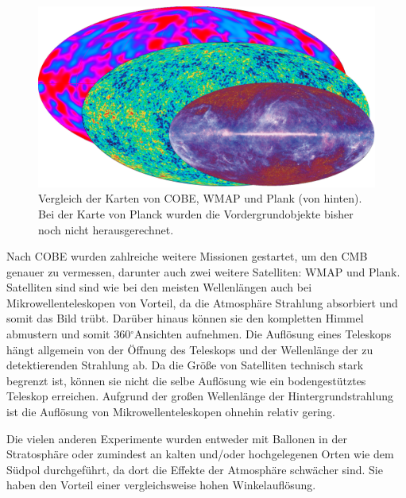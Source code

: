 \documentclass[10pt,a4paper]{article}
\newcommand{\degree}{$^\circ$}
\begin{document}
\begin{figure}
\center
\includegraphics[scale=0.15]{CMB}
\caption{Vergleich der Karten von COBE, WMAP und Plank (von hinten). Bei der Karte von Planck wurden die Vordergrundobjekte bisher noch nicht herausgerechnet.}
\label{cmb}
\end{figure}

Nach COBE wurden zahlreiche weitere Missionen gestartet, um den CMB genauer zu vermessen, darunter auch zwei weitere Satelliten: WMAP und Plank.
Satelliten sind sind wie bei den meisten Wellenlängen auch bei Mikrowellenteleskopen von Vorteil, da die Atmosphäre Strahlung absorbiert und somit das Bild trübt. Darüber hinaus können sie den kompletten Himmel abmustern und somit 360\degree Ansichten aufnehmen. Die Auflösung eines Teleskops hängt allgemein von der Öffnung des Teleskops und der Wellenlänge der zu detektierenden Strahlung ab. Da die Größe von Satelliten technisch stark begrenzt ist, können sie nicht die selbe Auflösung wie ein bodengestütztes Teleskop erreichen. Aufgrund der großen Wellenlänge der Hintergrundstrahlung ist die Auflösung von Mikrowellenteleskopen ohnehin relativ gering.

Die vielen anderen Experimente wurden entweder mit Ballonen in der Stratosphäre oder zumindest an kalten und/oder hochgelegenen Orten wie dem Südpol durchgeführt, da dort die Effekte der Atmosphäre schwächer sind. Sie haben den Vorteil einer vergleichsweise hohen Winkelauflösung.
\end{document}
